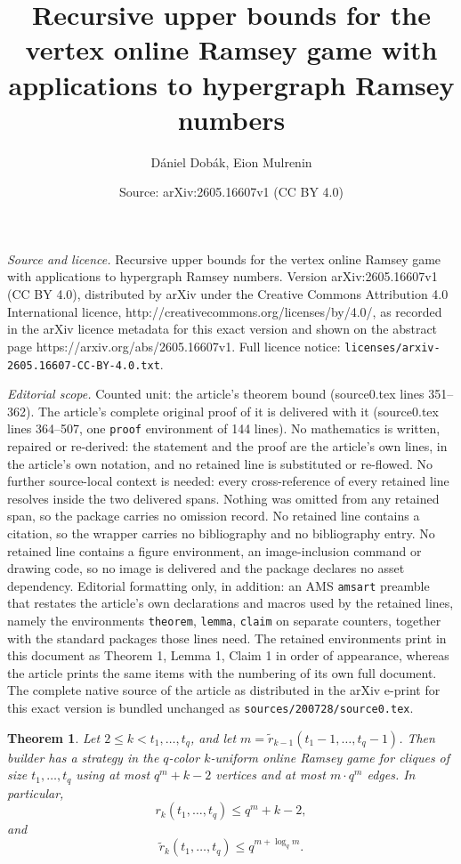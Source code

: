 \documentclass[10pt,a4paper]{amsart}
\title{Recursive upper bounds for the vertex online Ramsey game with applications to hypergraph Ramsey numbers}
\author{D\'aniel Dob\'ak, Eion Mulrenin}
\date{Source: arXiv:2605.16607v1 (CC BY 4.0)}
\newtheorem{theorem}{Theorem}
\begin{document}
\maketitle

\noindent\emph{Source and licence.} Recursive upper bounds for the vertex online Ramsey game with applications to hypergraph Ramsey numbers. Version arXiv:2605.16607v1 (CC BY 4.0), distributed by arXiv under the Creative Commons Attribution 4.0 International licence, http://creativecommons.org/licenses/by/4.0/, as recorded in the arXiv licence metadata for this exact version and shown on the abstract page https://arxiv.org/abs/2605.16607v1. Full licence notice: \texttt{licenses/arxiv-2605.16607-CC-BY-4.0.txt}.\par\smallskip

\noindent\textit{Editorial scope.} Counted unit: the article's theorem bound (source0.tex lines 351--362). The article's complete original proof of it is delivered with it (source0.tex lines 364--507, one \texttt{proof} environment of 144 lines). No mathematics is written, repaired or re-derived: the statement and the proof are the article's own lines, in the article's own notation, and no retained line is substituted or re-flowed.  No further source-local context is needed: every cross-reference of every retained line resolves inside the two delivered spans.  Nothing was omitted from any retained span, so the package carries no omission record.  No retained line contains a citation, so the wrapper carries no bibliography and no bibliography entry.  No retained line contains a figure environment, an image-inclusion command or drawing code, so no image is delivered and the package declares no asset dependency.  Editorial formatting only, in addition: an AMS \texttt{amsart} preamble that restates the article's own declarations and macros used by the retained lines, namely the environments \texttt{theorem}, \texttt{lemma}, \texttt{claim} on separate counters, together with the standard packages those lines need.  The retained environments print in this document as Theorem 1, Lemma 1, Claim 1 in order of appearance, whereas the article prints the same items with the numbering of its own full document.  The complete native source of the article as distributed in the arXiv e-print for this exact version is bundled unchanged as \texttt{sources/200728/source0.tex}.
\begin{theorem}
    Let $2 \leq k < t_1, \dots, t_q$, and let $m = \tilde{r}_{k-1}(t_1-1, \dots, t_q-1)$.
    Then builder has a strategy in the $q$-color $k$-uniform online Ramsey game for cliques of size $t_1, \dots, t_q$ using at most $q^m+ k - 2$ vertices and at most $m \cdot q^m$ edges.
    In particular,
    \begin{equation} \label{eq: q-color ramsey bound}
        r_k(t_1, \dots, t_q) \leq q^m + k - 2,
    \end{equation}
    and
    \begin{equation} \label{eq: q-color online bound}
        \tilde{r}_k(t_1, \dots, t_q) \leq q^{m + \log_q m}.
    \end{equation}
\end{theorem}
\end{document}

